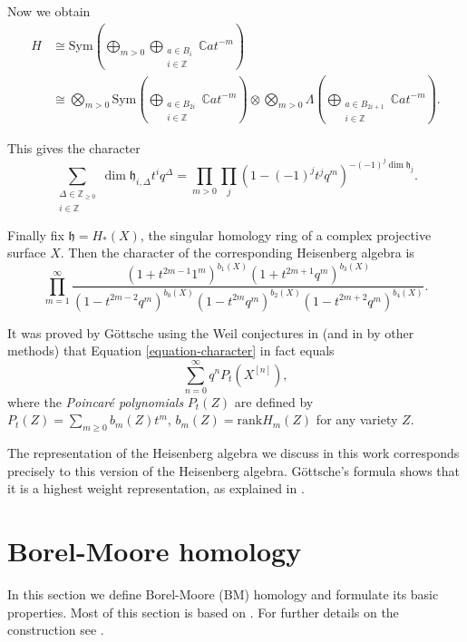 Now we obtain
$$
\begin{aligned}
H&\cong
\text{Sym}\left(\bigoplus_{m>0}\bigoplus
_{\substack{a \in B_i \\ i \in \mathbb{Z}}}
\mathbb{C}at^{-m}\right)\\
&\cong
\bigotimes_{m>0}\text{Sym}\left(\bigoplus
_{\substack{a \in B_{2i} \\ i \in
\mathbb{Z}}}
\mathbb{C}at^{-m}\right)
\otimes\bigotimes_{m>0}
\Lambda\left(\bigoplus_{
\substack{a \in B_{2i+1} \\ i \in
\mathbb{Z}}}
\mathbb{C}at^{-m}\right).
\end{aligned}
$$

\noindent
This gives the character
$$
\sum_{\substack{\Delta\in \mathbb{Z}_{\geq
0}  \\ i \in \mathbb{Z}}}
\dim \mathfrak{h}_{i,\Delta}t^iq^\Delta
=\prod_{m>0}\prod_j(1-(-1)^jt^jq^m)^{-(-1)^j\dim \mathfrak{h}_j}.
$$

\noindent
Finally fix $\mathfrak{h}=H_*(X)$, the
singular homology ring
of a complex projective surface $X$.
Then the character of the corresponding
Heisenberg algebra is
\begin{equation}
\label{equation-character}
\prod_{m=1}^\infty \frac{
(1+t^{2m-1}1^m)^{b_1(X)}
(1+t^{2m+1}q^m)^{b_3(X)}}
{(1-t^{2m-2}q^m)^{b_0(X)}
(1-t^{2m}q^m)^{b_2(X)}
(1-t^{2m+2}q^m)^{b_4(X)}}.
\end{equation}

\noindent
It was proved by Göttsche using the Weil
conjectures in \cite{Gottsche1990}
(and in \cite[Section
6.2]{Nakajima-lectures} by other methods)
that Equation \ref{equation-character}
in fact equals
$$
\sum_{n=0}^\infty q^nP_t(X^{[n]}),
$$
where the {\it Poincaré polynomials}
$P_t(Z)$ are defined by
$P_t(Z)=\sum_{m\geq 0}b_m(Z)t^m$,
$b_m(Z)=\text{rank}H_m(Z)$ for
any variety $Z$.

The representation
of the Heisenberg algebra we discuss in this
work corresponds
precisely to this version of the Heisenberg
algebra.
Göttsche's formula shows that it is a
highest weight representation,
as explained in \cite[Corollary
8.16]{Nakajima-lectures}.




\section{Borel-Moore homology}
\label{section-bm}

\noindent
In this section we define Borel-Moore (BM)
homology
and formulate its basic properties.
Most of this section is based on \cite[Video
9]{videos}.
For further details on the construction see
\cite{Fulton-Young-Tableaux}.

